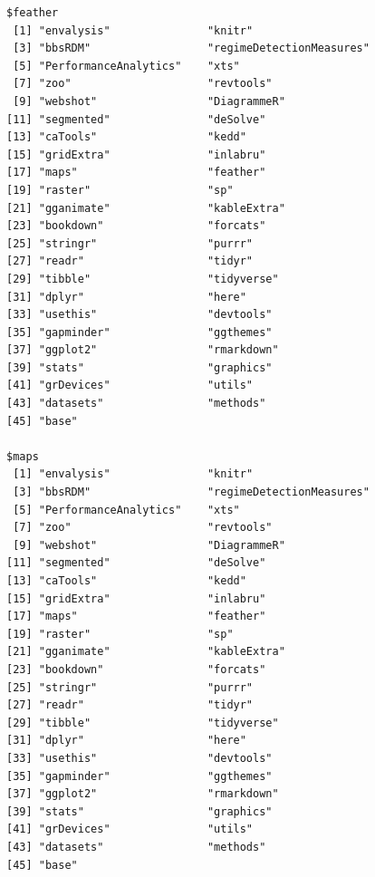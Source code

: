 \documentclass[12pt,twoside,openany]{reedthesis}
\begin{document}
\begin{verbatim}
$feather
 [1] "envalysis"               "knitr"                  
 [3] "bbsRDM"                  "regimeDetectionMeasures"
 [5] "PerformanceAnalytics"    "xts"                    
 [7] "zoo"                     "revtools"               
 [9] "webshot"                 "DiagrammeR"             
[11] "segmented"               "deSolve"                
[13] "caTools"                 "kedd"                   
[15] "gridExtra"               "inlabru"                
[17] "maps"                    "feather"                
[19] "raster"                  "sp"                     
[21] "gganimate"               "kableExtra"             
[23] "bookdown"                "forcats"                
[25] "stringr"                 "purrr"                  
[27] "readr"                   "tidyr"                  
[29] "tibble"                  "tidyverse"              
[31] "dplyr"                   "here"                   
[33] "usethis"                 "devtools"               
[35] "gapminder"               "ggthemes"               
[37] "ggplot2"                 "rmarkdown"              
[39] "stats"                   "graphics"               
[41] "grDevices"               "utils"                  
[43] "datasets"                "methods"                
[45] "base"                   

$maps
 [1] "envalysis"               "knitr"                  
 [3] "bbsRDM"                  "regimeDetectionMeasures"
 [5] "PerformanceAnalytics"    "xts"                    
 [7] "zoo"                     "revtools"               
 [9] "webshot"                 "DiagrammeR"             
[11] "segmented"               "deSolve"                
[13] "caTools"                 "kedd"                   
[15] "gridExtra"               "inlabru"                
[17] "maps"                    "feather"                
[19] "raster"                  "sp"                     
[21] "gganimate"               "kableExtra"             
[23] "bookdown"                "forcats"                
[25] "stringr"                 "purrr"                  
[27] "readr"                   "tidyr"                  
[29] "tibble"                  "tidyverse"              
[31] "dplyr"                   "here"                   
[33] "usethis"                 "devtools"               
[35] "gapminder"               "ggthemes"               
[37] "ggplot2"                 "rmarkdown"              
[39] "stats"                   "graphics"               
[41] "grDevices"               "utils"                  
[43] "datasets"                "methods"                
[45] "base"                   


\end{verbatim}
\end{document}
